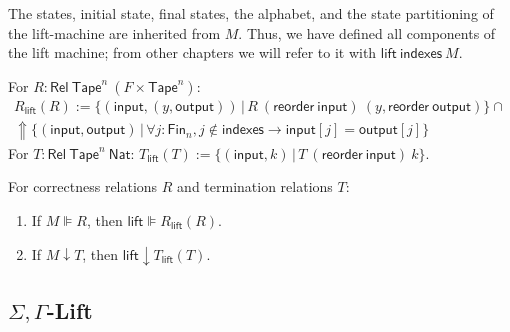 \documentclass{psartcl}
\newcommand{\MS}[1]{\textsf{#1}}
\newcommand{\setOf}[1]{\bigl \{ #1 \bigr \}}
\newcommand{\setMap}[2]{\setOf{#1 \,\big|\, #2}}
\newcommand{\Fin}{\MS{Fin}}
\newcommand{\Nat}{\MS{Nat}}
\newcommand{\Tape}{\MS{Tape}}
\newcommand{\Tapes}[1]{\Tape^{#1}}
\newcommand{\Tau}{\Gamma}
\newcommand{\Rel}{\mathsf{Rel}}
\begin{document}
The states, initial state, final states, the alphabet, and the state partitioning of the lift-machine are inherited from $M$.
Thus, we have defined all components of the lift machine; from other chapters we will refer to it with $\MS{lift}~\MS{indexes}~M$.

\begin{definition}
  \label{def:m,n-rellift}
  For $R : \Rel~\Tapes{n}~(F \times \Tapes{n})$:
  \begin{multline*}
    R_{\MS{lift}}(R) := \setMap{(\MS{input}, (y, \MS{output}))}{R~(\MS{reorder}~\MS{input})~(y,\MS{reorder}~\MS{output})} \cap \\
    \Uparrow \setMap{(\MS{input},\MS{output})}{\forall j:\Fin_n, j \notin \MS{indexes} \rightarrow \MS{input}[j] = \MS{output}[j]}
  \end{multline*}
  For $T : \Rel~\Tapes{n}~\Nat$: $ T_{\MS{lift}}(T) := \setMap{(\MS{input}, k)}{T~(\MS{reorder}~\MS{input})~k} $.
\end{definition}

\begin{lemma}
  \label{lem:m,n-correctness}
  For correctness relations $R$ and termination relations $T$:
  \begin{enumerate}
    \item
      If $M \VDash R$, then $\MS{lift} \VDash R_{\MS{lift}}(R)$.
    \item
      If $M \downarrow T$, then $\MS{lift} \downarrow T_{\MS{lift}}(T)$.
  \end{enumerate}
\end{lemma}

\subsection{\texorpdfstring{$\Sigma,\Tau$}{Sigma,Gamma}-Lift}
\label{sub:sigma-gamma}
\end{document}
